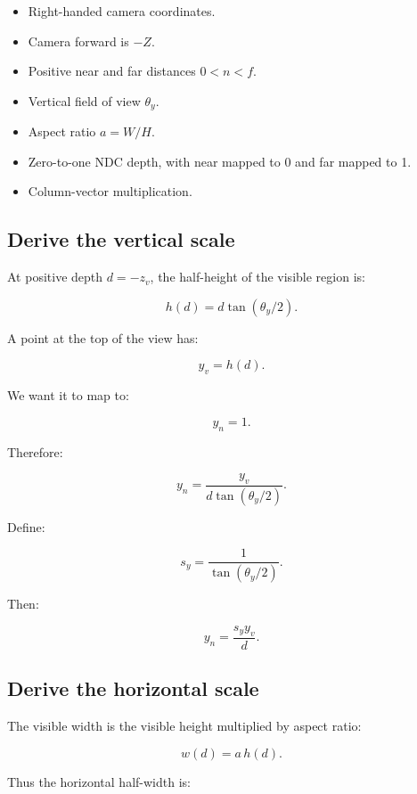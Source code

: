 \begin{itemize}
\tightlist
\item
  Right-handed camera coordinates.
\item
  Camera forward is \(-Z\).
\item
  Positive near and far distances \(0<n<f\).
\item
  Vertical field of view \(\theta_y\).
\item
  Aspect ratio \(a=W/H\).
\item
  Zero-to-one NDC depth, with near mapped to 0 and far mapped to 1.
\item
  Column-vector multiplication.
\end{itemize}

\subsection{Derive the vertical scale}\label{02-foundations-ii-ch033-derive-the-vertical-scale}

\hypertarget{02-foundations-ii-ch033-derive-the-vertical-scale}{}

At positive depth \(d=-z_v\), the half-height of the visible region is:

\[
 h(d)=d\tan(\theta_y/2).
\]

A point at the top of the view has:

\[
 y_v=h(d).
\]

We want it to map to:

\[
 y_n=1.
\]

Therefore:

\[
 y_n= \frac{y_v}{d\tan(\theta_y/2)}.
\]

Define:

\[
 \boxed{ s_y=\frac1{\tan(\theta_y/2)} }.
\]

Then:

\[
 \boxed{ y_n=\frac{s_yy_v}{d} }.
\]

\subsection{Derive the horizontal scale}\label{02-foundations-ii-ch033-derive-the-horizontal-scale}

\hypertarget{02-foundations-ii-ch033-derive-the-horizontal-scale}{}

The visible width is the visible height multiplied by aspect ratio:

\[
 w(d)=a\,h(d).
\]

Thus the horizontal half-width is:

